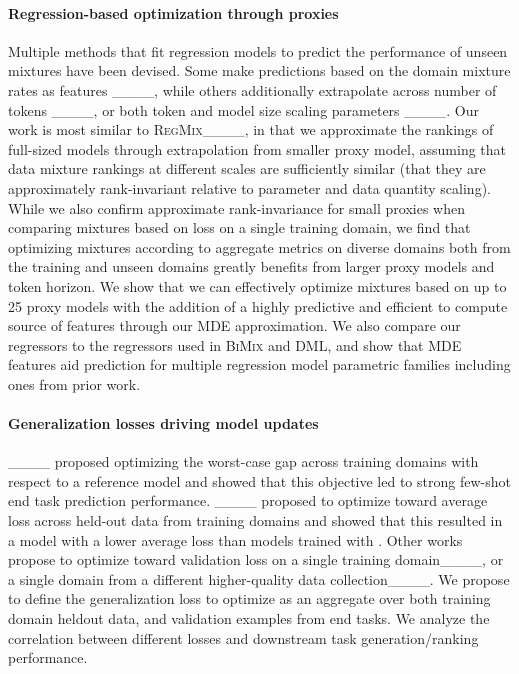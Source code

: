 \paragraph{Regression-based optimization through proxies}

Multiple methods that fit regression models to predict the performance of unseen mixtures have been devised. Some make predictions based on the domain mixture rates as features ____, while others additionally extrapolate across number of tokens ____, or both token and model size scaling parameters ____. Our work is most similar to \textsc{RegMix}____, in that we approximate the rankings of full-sized models through extrapolation from smaller proxy model, assuming that data mixture rankings at different scales are sufficiently similar (that they are approximately rank-invariant relative to parameter and data quantity scaling). While we also confirm approximate rank-invariance for small proxies when comparing mixtures based on loss on a single training domain, we find that optimizing mixtures according to aggregate metrics on diverse domains both from the training and unseen domains greatly benefits from larger proxy models and token horizon.  We show that we can effectively optimize mixtures based on up to 25 proxy models with the addition of a highly predictive and efficient to compute source of features through our MDE approximation. We also compare our regressors to the regressors used in \textsc{BiMix} and \textsc{DML}, and show that MDE features aid prediction for multiple regression model parametric families including ones from prior work.


\paragraph{Generalization losses driving model updates}

____ proposed optimizing the worst-case gap across training domains with respect to a reference model and showed that this objective led to strong few-shot end task prediction performance. \doge____ proposed to optimize toward average loss across held-out data from training domains and showed that this resulted in a model with a lower average loss than models trained with \doremi. Other works propose to optimize toward validation loss on a single training domain____, or a single domain from a different higher-quality data collection____. We propose to define the generalization loss to optimize as an aggregate over both training domain heldout data, and validation examples from end tasks. We analyze the correlation between different losses and downstream task generation/ranking performance.

